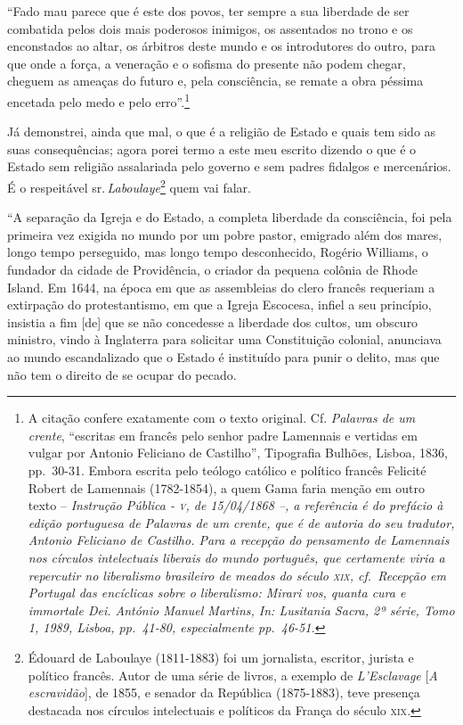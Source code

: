 ``Fado mau parece que é este dos povos, ter sempre a sua liberdade de ser
combatida pelos dois mais poderosos inimigos, os assentados no trono e
os enconstados ao altar, os árbitros deste mundo e os introdutores do
outro, para que onde a força, a veneração e o sofisma do presente não
podem chegar, cheguem as ameaças do futuro e, pela consciência, se
remate a obra péssima encetada pelo medo e pelo erro''.\footnote{A
  citação confere exatamente com o texto original. Cf. \emph{Palavras de
  um crente}, ``escritas em francês pelo senhor padre Lamennais e
  vertidas em vulgar por Antonio Feliciano de Castilho'', Tipografia
  Bulhões, Lisboa, 1836, pp.~30-31. Embora escrita pelo teólogo católico
  e político francês Felicité Robert de Lamennais (1782-1854), a quem
  Gama faria menção em outro texto -- \emph{Instrução Pública - \textsc{v}, de
  15/04/1868 --, a referência é do prefácio à edição portuguesa de
  \emph{Palavras de um crente}, que é de autoria do seu tradutor,
  Antonio Feliciano de Castilho. Para a recepção do pensamento de
  Lamennais nos círculos intelectuais liberais do mundo português, que
  certamente viria a repercutir no liberalismo brasileiro de meados do
  século \textsc{xix}, cf.~\emph{Recepção em Portugal das encíclicas sobre o
  liberalismo:} Mirari vos, quanta cura e immortale Dei. António Manuel
  Martins, In: \emph{Lusitania Sacra}, 2ª série, Tomo 1, 1989, Lisboa,
  pp.~41-80, especialmente pp.~46-51.}}

Já demonstrei, ainda que mal, o que é a religião de Estado e quais tem
sido as suas consequências; agora porei termo a este meu escrito dizendo
o que é o Estado sem religião assalariada pelo governo e sem padres
fidalgos e mercenários. É o respeitável sr.\,\emph{Laboulaye}\footnote{
  Édouard de Laboulaye (1811-1883) foi um jornalista, escritor, jurista
  e político francês. Autor de uma série de livros, a exemplo de
  \emph{L'Esclavage} {[}\emph{A escravidão}{]}, de 1855, e senador da
  República (1875-1883), teve presença destacada nos círculos
  intelectuais e políticos da França do século \textsc{xix}.} quem vai falar.

``A separação da Igreja e do Estado, a completa liberdade da consciência,
foi pela primeira vez exigida no mundo por um pobre pastor, emigrado
além dos mares, longo tempo perseguido, mas longo tempo desconhecido,
Rogério Williams, o fundador da cidade de Providência, o criador da
pequena colônia de Rhode Island. Em 1644, na época em que as assembleias
do clero francês requeriam a extirpação do protestantismo, em que a
Igreja Escocesa, infiel a seu princípio, insistia a fim {[}de{]} que se
não concedesse a liberdade dos cultos, um obscuro ministro, vindo à
Inglaterra para solicitar uma Constituição colonial, anunciava ao mundo
escandalizado que o Estado é instituído para punir o delito, mas que não
tem o direito de se ocupar do pecado.


